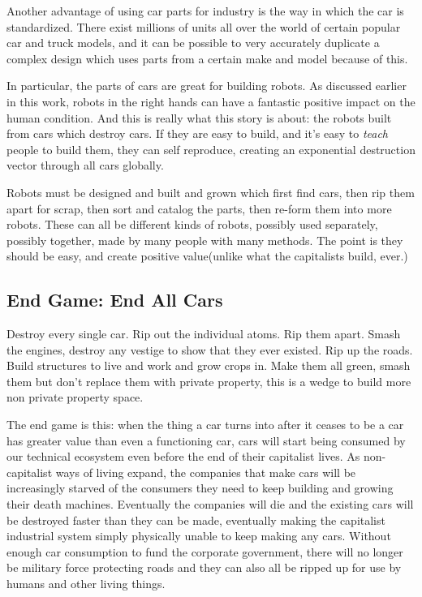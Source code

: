 Another advantage of using car parts for industry is the way in which
the car is standardized. There exist millions of units all over the
world of certain popular car and truck models, and it can be possible to
very accurately duplicate a complex design which uses parts from a
certain make and model because of this.

In particular, the parts of cars are great for building robots. As
discussed earlier in this work, robots in the right hands can have a
fantastic positive impact on the human condition. And this is really
what this story is about: the robots built from cars which destroy cars.
If they are easy to build, and it's easy to \emph{teach} people to build
them, they can self reproduce, creating an exponential destruction
vector through all cars globally.

Robots must be designed and built and grown which first find cars, then
rip them apart for scrap, then sort and catalog the parts, then re-form
them into more robots. These can all be different kinds of robots,
possibly used separately, possibly together, made by many people with
many methods. The point is they should be easy, and create positive
value(unlike what the capitalists build, ever.)

\subsection{End Game: End All Cars}\label{end-game-end-all-cars}

Destroy every single car. Rip out the individual atoms. Rip them apart.
Smash the engines, destroy any vestige to show that they ever existed.
Rip up the roads. Build structures to live and work and grow crops in.
Make them all green, smash them but don't replace them with private
property, this is a wedge to build more non private property space.

The end game is this: when the thing a car turns into after it ceases to
be a car has greater value than even a functioning car, cars will start
being consumed by our technical ecosystem even before the end of their
capitalist lives. As non-capitalist ways of living expand, the companies
that make cars will be increasingly starved of the consumers they need
to keep building and growing their death machines. Eventually the
companies will die and the existing cars will be destroyed faster than
they can be made, eventually making the capitalist industrial system
simply physically unable to keep making any cars. Without enough car
consumption to fund the corporate government, there will no longer be
military force protecting roads and they can also all be ripped up for
use by humans and other living things.

